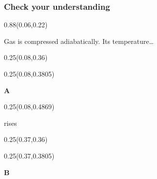 \documentclass[aspectratio=169]{beamer}
\begin{document}
\begin{frame}[t]
  \frametitle{Check your understanding}

\begin{textblock}{0.88}(0.06,0.22)
{\raggedright\fontsize{17}{20}\selectfont Gas is compressed adiabatically. Its temperature…\par}
\end{textblock}

%
\begin{textblock}{0.25}(0.08,0.36)
\end{textblock}

\begin{textblock}{0.25}(0.08,0.3805)
{\centering\fontsize{26}{31}\selectfont \textcolor[HTML]{FFFFFF}{\textbf{A}}\par}
\end{textblock}

\begin{textblock}{0.25}(0.08,0.4869)
{\centering\fontsize{14}{17}\selectfont \textcolor[HTML]{FFFFFF}{rises}\par}
\end{textblock}

%
\begin{textblock}{0.25}(0.37,0.36)
\end{textblock}

\begin{textblock}{0.25}(0.37,0.3805)
{\centering\fontsize{26}{31}\selectfont \textcolor[HTML]{FFFFFF}{\textbf{B}}\par}
\end{textblock}


\end{frame}
\end{document}
